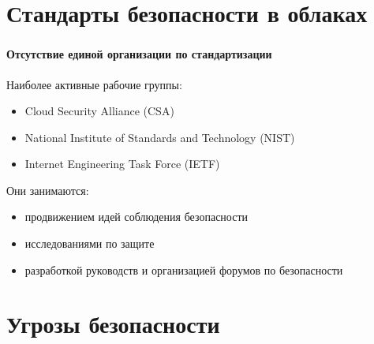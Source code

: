 
\frame[plain]{\titlepage} %


\section{Стандарты безопасности в облаках}

\begin{frame}
\frametitle{\insertsection}
\framesubtitle{Отсутствие единой организации по стандартизации}

Наиболее активные рабочие группы:
\begin{itemize}
    \item Cloud Security Alliance (CSA)
    \item National Institute of Standards and Technology (NIST)
    \item Internet Engineering Task Force (IETF)
\end{itemize}

\vspace{\baselineskip}

Они занимаются:
\begin{itemize}
    \item продвижением идей соблюдения безопасности
    \item исследованиями по защите
    \item разработкой руководств и организацией форумов по безопасности
\end{itemize}
\end{frame}


\section{Угрозы безопасности}

